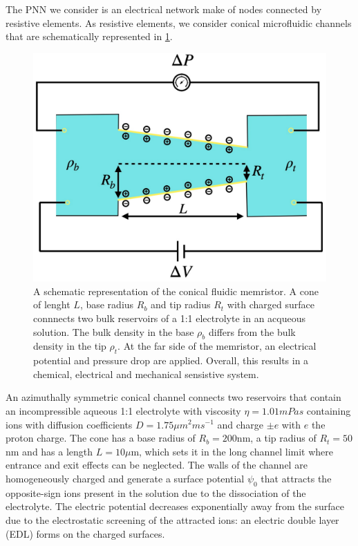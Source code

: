 \documentclass[reprint,superscriptaddress,prb,showkeys]{revtex4-2}
\begin{document}
The PNN we consider is an electrical network make of nodes connected by resistive elements. As resistive elements, we consider conical microfluidic channels that are schematically represented in \cref{fig:memristor_scheme}. 
\begin{figure}[h]
    \centering
    \includegraphics[width=\columnwidth]{plots/memristor/memristor_scheme.pdf}
    \caption{A schematic representation of the conical fluidic memristor. A cone of lenght $L$, base radius $R_b$ and tip radius $R_t$ with charged surface connnects two bulk reservoirs of a 1:1 electrolyte in an acqueous solution. The bulk density in the base $\rho_b$ differs from the bulk density in the tip $\rho_t$. At the far side of the memristor, an electrical potential and pressure drop are applied. Overall, this results in a chemical, electrical and mechanical sensistive system.}\label{fig:memristor_scheme}
\end{figure} 
An azimuthally symmetric conical channel connects two reservoirs that contain an incompressible aqueous 1:1 electrolyte with viscosity $\eta=1.01mPa s$ containing ions with diffusion coefficients $D = 1.75\mu m^2 ms^{-1}$ and charge $\pm e$ with $e$ the proton charge. The cone has a base radius of $R_b = 200$nm, a tip radius of $R_t=50$nm and has a length $L = 10\mu$m, which sets it in the long channel limit where entrance and exit effects can be neglected. The walls of the channel are homogeneously charged and generate a surface potential $\psi_0$ that attracts the opposite-sign ions present in the solution due to the dissociation of the electrolyte. The electric potential decreases exponentially away from the surface due to the electrostatic screening of the attracted ions: an electric double layer (EDL) forms on the charged surfaces. 
\end{document}
